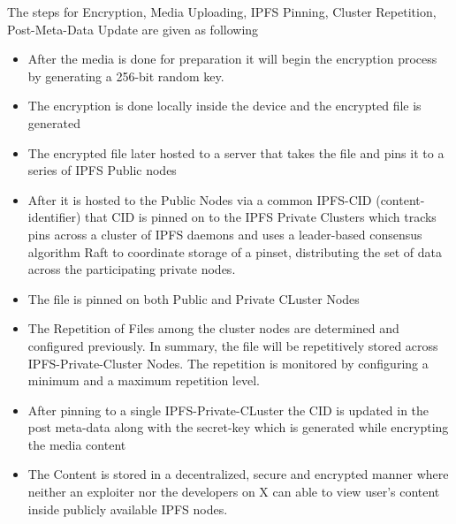 \documentclass[letterpaper,11pt]{article}
\begin{document}
The steps for Encryption, Media Uploading, IPFS Pinning, Cluster Repetition, Post-Meta-Data Update are given as following
\begin{itemize}[wide, labelwidth=!, labelindent=0pt]
\item After the media is done for preparation it will begin the encryption process by generating a 256-bit random key.
\item The encryption is done locally inside the device and the encrypted file is generated
\item The encrypted file later hosted to a server that takes the file and pins it to a series of IPFS Public nodes
\item After it is hosted to the Public Nodes via a common IPFS-CID (content-identifier) that CID is pinned on to the IPFS Private Clusters which tracks pins across a cluster of IPFS daemons and uses a leader-based consensus algorithm Raft to coordinate storage of a pinset, distributing the set of data across the participating private nodes.
\item The file is pinned on both Public and Private CLuster Nodes
\item The Repetition of Files among the cluster nodes are determined and configured previously. In summary, the file will be repetitively stored across IPFS-Private-Cluster Nodes. The repetition is monitored by configuring a minimum and a maximum repetition level.
\item After pinning to a single IPFS-Private-CLuster the CID is updated in the post meta-data along with the secret-key which is generated while encrypting the media content
\item The Content is stored in a decentralized, secure and encrypted manner where neither an exploiter nor the developers on X can able to view user's content inside publicly available IPFS nodes.
\end{itemize}
\end{document}

